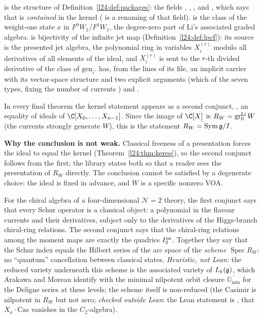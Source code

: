 \begin{dictionary}
 is the structure of Definition~\ref{l24:def:packages}: the fields ,
, , and , which says that  is \emph{contained} in the
kernel ( is a renaming of that field).  is the class of the
weight-one state $x$ in $F^0W_1/F^1W_1$, the degree-zero part of Li's associated graded algebra.
 is bijectivity of the infinite jet map (Definition~\ref{l24:def:lpcf}): its source is
the presented jet algebra, the polynomial ring in variables $X_i^{(r)}$ modulo all derivatives of all elements of the ideal,
and $X_i^{(r)}$ is sent to the $r$-th divided derivative of the class of $\mathrm{gen}_i$.
 has, from the  lines of its file, an implicit carrier  with
its vector-space structure and two explicit arguments  (which of the seven types,
fixing the number of currents ) and .

In every final theorem the kernel statement appears as a second conjunct,
, an equality
of ideals of $\C[X_0,\dots,X_{n-1}]$. Since the image of $\C[X]$ is $R_W=\operatorname{gr}^{\mathrm{Li}}_0W$ (the currents
strongly generate $W$), this is the statement $R_W=\operatorname{Sym}\mathfrak g/I$.

\textbf{Why the conclusion is not weak.} Classical freeness of a presentation forces the ideal to equal the kernel
(Theorem~\ref{l24:thm:kereq}), so the second conjunct follows from the first; the library states both so that a reader
sees the presentation of $R_W$ directly. The conclusion cannot be satisfied by a degenerate choice: the ideal is fixed in
advance, and $W$ is a specific nonzero VOA.
\end{dictionary}

\begin{physics}
For the chiral algebra of a four-dimensional $\mathcal N=2$ theory, the first conjunct says that every Schur operator
is a classical object: a polynomial in the flavour currents and their derivatives, subject only to the derivatives of
the Higgs-branch chiral-ring relations. The second conjunct says that the chiral-ring relations among the moment maps
are exactly the quadrics $I_2^{\mathrm{ns}}$. Together they say that the Schur index equals the Hilbert series of the arc
space of the \emph{scheme} $\operatorname{Spec}R_W$: no ``quantum'' cancellation between classical states.
\emph{Heuristic, not Lean:} the reduced variety underneath this scheme is the associated variety of $L_k(\mathfrak g)$,
which Arakawa and Moreau identify with the minimal nilpotent orbit closure $\overline{\mathbb O_{\min}}$ for the Deligne
series at these levels; the scheme itself is non-reduced (the Casimir is nilpotent in $R_W$ but not zero; \emph{checked outside Lean}: the Lean statement is , that $X_a\cdot\mathrm{Cas}$ vanishes in the $C_2$-algebra).
\end{physics}

